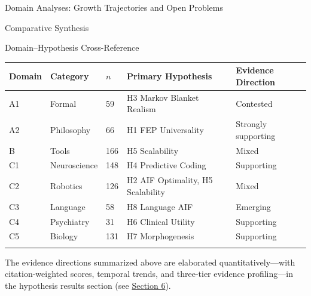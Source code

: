 \documentclass[
  ignorenonframetext,
]{beamer}
\newcounter{none} %
\begin{document}
\begin{frame}{Domain Analyses: Growth Trajectories and Open Problems
\label{sec:subfield_analyses}}
\begin{block}{Comparative Synthesis}
\begin{block}{Domain--Hypothesis Cross-Reference}
{\def\LTcaptype{none} %
\begin{longtable}[]{@{}lllll@{}}
\toprule\noalign{}
Domain & Category & \(n\) & Primary Hypothesis & Evidence Direction \\
\midrule\noalign{}
\endhead
A1 & Formal & 59 & H3 Markov Blanket Realism & Contested \\
A2 & Philosophy & 66 & H1 FEP Universality & Strongly supporting \\
B & Tools & 166 & H5 Scalability & Mixed \\
C1 & Neuroscience & 148 & H4 Predictive Coding & Supporting \\
C2 & Robotics & 126 & H2 AIF Optimality, H5 Scalability & Mixed \\
C3 & Language & 58 & H8 Language AIF & Emerging \\
C4 & Psychiatry & 31 & H6 Clinical Utility & Supporting \\
C5 & Biology & 131 & H7 Morphogenesis & Supporting \\
\bottomrule\noalign{}
\end{longtable}
}

The evidence directions summarized above are elaborated
quantitatively---with citation-weighted scores, temporal trends, and
three-tier evidence profiling---in the hypothesis results section (see
\hyperref[sec:hypothesis_results]{Section 6}).
\end{block}
\end{block}
\end{frame}
\end{document}
